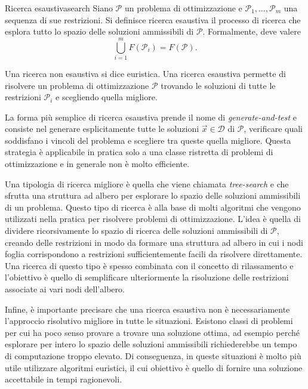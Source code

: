 \begin{definition}{Ricerca esaustiva}{search}
    Siano \( \mathcal{P} \) un problema di ottimizzazione e \( \mathcal{P}_1, \ldots, \mathcal{P}_m \) una sequenza di
    sue restrizioni. Si definisce ricerca esaustiva il processo di ricerca che esplora tutto lo spazio delle soluzioni
    ammissibili di \( \mathcal{P} \). Formalmente, deve valere
    \[
        \bigcup_{i = 1}^m F(\mathcal{P}_i) = F(\mathcal{P}).
    \]
\end{definition}
\noindent
Una ricerca non esaustiva si dice euristica. Una ricerca esaustiva permette di risolvere un problema di ottimizzazione
\( \mathcal{P} \) trovando le soluzioni di tutte le restrizioni
\(
    \mathcal{P}_i
\)
e scegliendo quella migliore.

La forma più semplice di ricerca esaustiva prende il nome di \textit{generate-and-test} e consiste nel generare
esplicitamente tutte le soluzioni \( \vec{x} \in \mathcal{D} \) di \( \mathcal{P} \), verificare quali soddisfano i
vincoli del problema e scegliere tra queste quella migliore. Questa strategia è applicabile in pratica solo a una classe
ristretta di problemi di ottimizzazione e in generale non è molto efficiente.

Una tipologia di ricerca migliore è quella che viene chiamata \textit{tree-search} e che sfrutta una struttura ad albero
per esplorare lo spazio delle soluzioni ammissibili di un problema. Questo tipo di ricerca è alla base di molti
algoritmi che vengono utilizzati nella pratica per risolvere problemi di ottimizzazione. L'idea è quella di dividere
ricorsivamente lo spazio di ricerca delle soluzioni ammissibili di \( \mathcal{P} \), creando delle restrizioni in modo
da formare una struttura ad albero in cui i nodi foglia corrispondono a restrizioni sufficientemente facili da risolvere
direttamente. Una ricerca di questo tipo è spesso combinata con il concetto di rilassamento e l'obiettivo è quello di
semplificare ulteriormente la risoluzione delle restrizioni associate ai vari nodi dell'albero.

Infine, è importante precisare che una ricerca esaustiva non è necessariamente l'approccio risolutivo migliore in tutte
le situazioni. Esistono classi di problemi per cui ha poco senso provare a trovare una soluzione ottima, ad esempio
perché esplorare per intero lo spazio delle soluzioni ammissibili richiederebbe un tempo di computazione troppo elevato.
Di conseguenza, in queste situazioni è molto più utile utilizzare algoritmi euristici, il cui obiettivo è quello di
fornire una soluzione accettabile in tempi ragionevoli.

